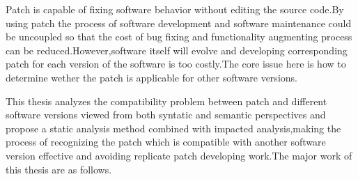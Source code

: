
\begin{eabstract} 
%		

		Patch is capable of fixing software behavior without editing the source code.By using patch the process of software development and software maintenance could be uncoupled so that the cost of bug fixing and functionality augmenting process can be reduced.However,software itself will evolve and developing corresponding patch for each version of the software is too costly.The core issue here is how to determine wether the patch is applicable for other software versions.
		
		This thesis analyzes the compatibility problem between patch and different software versions viewed from both syntatic and semantic perspectives and propose a static analysis method combined with impacted analysis,making the process of recognizing the patch which is compatible with another software version effective and avoiding replicate patch developing work.The major work of this thesis are as follows.
		

\end{eabstract}
